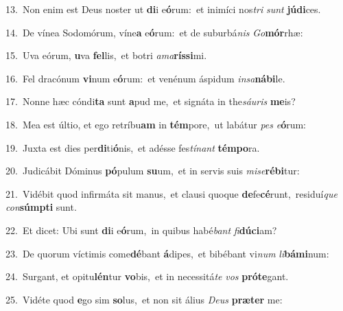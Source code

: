 {\numbfont\textcolor{\numbcolor}{13.}}~Non enim est Deus noster ut \textbf{di}\-i e\-\textbf{ó}\-rum:~\star et inimíci nos\textit{tri} \textit{sunt} \textbf{jú}\-\textbf{di}ces.\par
{\numbfont\textcolor{\numbcolor}{14.}}~De vínea Sodomórum, víne\textbf{a} e\-\textbf{ó}\-rum:~\star et de suburbá\textit{nis} \textit{Go}\-\textbf{mór}rhæ:\par
{\numbfont\textcolor{\numbcolor}{15.}}~Uva eórum, \textbf{u}\-va \textbf{fel}\-lis,~\star et botri \textit{a}\-\textit{ma}\textbf{rís}\textbf{si}mi.\par
{\numbfont\textcolor{\numbcolor}{16.}}~Fel dracónum \textbf{vi}\-num e\-\textbf{ó}\-rum:~\star et venénum áspidum \textit{in}\-\textit{sa}\textbf{ná}\textbf{bi}le.\par
{\numbfont\textcolor{\numbcolor}{17.}}~Nonne hæc cóndi\textbf{ta} sunt \textbf{a}\-pud me,~\star et signáta in the\-\textit{sáu}\-\textit{ris} \textbf{me}\-is?\par
{\numbfont\textcolor{\numbcolor}{18.}}~Mea est últio, et ego retríbu\textbf{am} in \textbf{tém}\-pore,~\star ut labátur \textit{pes} \textit{e}\-\textbf{ó}rum:\par
{\numbfont\textcolor{\numbcolor}{19.}}~Juxta est dies per\-\textbf{di}\-ti\-\textbf{ó}\-nis,~\star et adésse fes\-\textit{tí}\-\textit{nant} \textbf{tém}\-\textbf{po}ra.\par
{\numbfont\textcolor{\numbcolor}{20.}}~Judicábit Dóminus \textbf{pó}\-pulum \textbf{su}\-um,~\star et in servis suis \textit{mi}\-\textit{se}\textbf{ré}\textbf{bi}tur:\par
{\numbfont\textcolor{\numbcolor}{21.}}~Vidébit quod infirmáta sit manus,~\dagger et clausi quoque \textbf{de}\-fe\-\textbf{cé}\-runt,~\star residuí\textit{que} \textit{con}\-\textbf{súmp}\textbf{ti} sunt.\par
{\numbfont\textcolor{\numbcolor}{22.}}~Et dicet: Ubi sunt \textbf{di}\-i e\-\textbf{ó}\-rum,~\star in quibus habé\textit{bant} \textit{fi}\-\textbf{dú}\textbf{ci}am?\par
{\numbfont\textcolor{\numbcolor}{23.}}~De quorum víctimis come\-\textbf{dé}\-bant \textbf{á}\-dipes,~\star et bibébant vi\textit{num} \textit{li}\-\textbf{bá}\textbf{mi}num:\par
{\numbfont\textcolor{\numbcolor}{24.}}~Surgant, et opitu\-\textbf{lén}\-tur \textbf{vo}\-bis,~\star et in necessitá\textit{te} \textit{vos} \textbf{pró}\-\textbf{te}gant.\par
{\numbfont\textcolor{\numbcolor}{25.}}~Vidéte quod \textbf{e}\-go sim \textbf{so}\-lus,~\star et non sit álius \textit{De}\-\textit{us} \textbf{præ}\-\textbf{ter} me:\par

